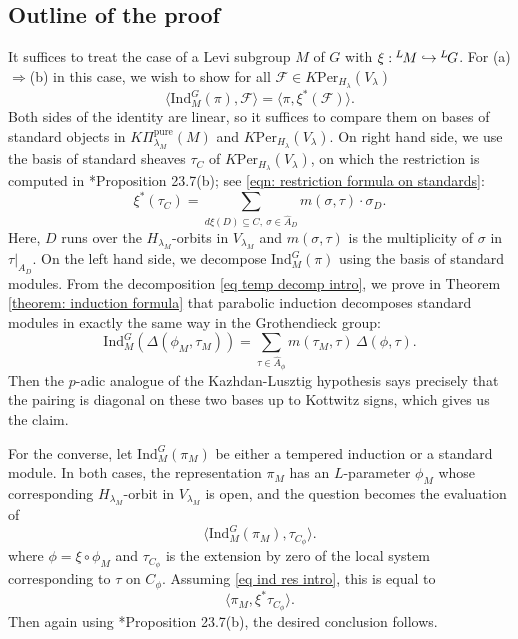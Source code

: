 \documentclass[11pt,letterpaper]{amsart}
\newcommand{\irrepdual}[1]{\widehat{#1}}
\newcommand{\Lgroup}[1]{{\hskip-2 pt \,^L\hskip-1pt{#1}}}
\newcommand{\pure}{\mathrm{pure}}
\newcommand{\Ind}{\mathrm{Ind}}
\newcommand{\Per}{\mathrm{Per}}
\newcommand{\stsh}[2]{{#1}_{#2}}
\renewcommand{\implies}{\Rightarrow}
\renewcommand{\1}{\mathbbm{1}}
\numberwithin{equation}{section}
\begin{document}
\subsection{Outline of the proof}
It suffices to treat the case of a Levi subgroup $M$ of $G$ with $\xi: \Lgroup{}{M}\hookrightarrow \Lgroup{G}$. For (a)$\implies$(b) in this case, we wish to show for all $\mathcal{F}\in K\Per_{H_\lambda}(V_\lambda)$
\[\langle \Ind_M^G(\pi), \mathcal{F}\rangle = \langle \pi, \xi^*(\mathcal{F})\rangle.\] Both sides of the identity 
are linear, so it suffices to compare them on bases of standard objects in  $K\Pi_{\lambda_M}^\pure(M)$ and $K\Per_{H_\lambda}(V_\lambda)$. On right hand side, we use the basis of standard sheaves $\stsh{\tau}{C}$ of $K\Per_{H_\lambda}(V_\lambda)$, on which the restriction is computed in \cite{ABV92}*{Proposition 23.7(b)}; see \eqref{eqn: restriction formula on standards}:
\[
    \xi^*(\stsh{\tau}{C}) = \sum_{d\xi(D)\subseteq C,~\sigma \in \irrepdual{A}_D} m(\sigma,\tau) \cdot  \stsh{\sigma}{D}.
\]
Here, $D$ runs over the $H_{\lambda_M}$-orbits in $V_{\lambda_M}$ and $m(\sigma,\tau)$ is the multiplicity of $\sigma$ in $\tau \vert_{A_D}$. On the left hand side, we decompose $\Ind_M^G(\pi)$ using the basis of standard modules. From the decomposition \eqref{eq temp decomp intro}, we prove in Theorem \ref{theorem: induction formula} that parabolic induction decomposes standard modules in exactly the same way in the Grothendieck group:
\[\Ind_M^G(\Delta(\phi_M,\tau_M))=\sum_{\tau \in \irrepdual{A}_\phi} m(\tau_M,\tau)\, \Delta(\phi,\tau).\]
Then the $p$-adic analogue of the Kazhdan-Lusztig hypothesis says precisely that the pairing is diagonal on these two bases up to Kottwitz signs, which gives us the claim.


For the converse, let $\Ind_M^G(\pi_M)$ be either {a tempered induction or a standard module}. In both cases, the representation $\pi_M$ has an $L$-parameter $\phi_M$ whose corresponding $H_{\lambda_M}$-orbit in $V_{\lambda_M}$ is open, and the question becomes the evaluation of 
\[\langle \Ind_M^G(\pi_M), \stsh{\tau}{C_{\phi}} \rangle.\]
where $\phi=\xi \circ \phi_M$  and $\tau_{C_\phi}$ is the extension by zero of the local system corresponding to $\tau$ on $C_\phi$. Assuming \eqref{eq ind res intro}, this is equal to 
\[  \langle \pi_M,  \xi^{\ast} \stsh{\tau}{C_{\phi}} \rangle. \]
 Then again using \cite{ABV92}*{Proposition 23.7(b)}, the desired conclusion follows.
\end{document}

